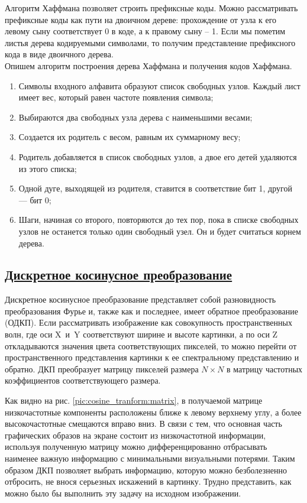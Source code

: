Алгоритм Хаффмана позволяет строить префиксные коды. Можно рассматривать префиксные коды как пути на двоичном дереве: прохождение от узла к его левому сыну соответствует 0 в коде, а к правому сыну – 1. Если мы пометим листья дерева кодируемыми символами, то получим представление префиксного кода в виде двоичного дерева.\\
Опишем алгоритм построения дерева Хаффмана и получения кодов Хаффмана.
\begin{enumerate}

	\item Символы входного алфавита образуют список свободных узлов. Каждый лист имеет вес, который равен частоте появления символа;
	\item Выбираются два свободных узла дерева с наименьшими весами;
	\item Создается их родитель с весом, равным их суммарному весу;
	\item Родитель добавляется в список свободных узлов, а двое его детей удаляются из этого списка;
	\item Одной дуге, выходящей из родителя, ставится в соответствие бит 1, другой — бит 0;
	\item Шаги, начиная со второго, повторяются до тех пор, пока в списке свободных узлов не останется только один свободный узел. Он и будет считаться корнем дерева.

\end{enumerate}


\subsection*{\hyperlink{toc}{Дискретное косинусное преобразование}}
Дискретное косинусное преобразование представляет собой разновидность преобразования Фурье и, также как и последнее, имеет обратное преобразование (ОДКП). Если рассматривать изображение как совокупность пространственных волн, где оси X~и~Y соответствуют ширине и высоте картинки, а по оси Z откладываются значения цвета соответствующих пикселей, то можно перейти от пространственного представления картинки к ее спектральному представлению и обратно. ДКП преобразует матрицу пикселей размера $N \times N$ в матрицу частотных коэффициентов соответствующего размера.

Как видно на рис. \ref{pic:cosine_tranform:matrix}, в получаемой матрице низкочастотные компоненты расположены ближе к левому верхнему углу, а более высокочастотные смещаются вправо вниз. В связи с тем, что основная часть графических образов на экране состоит из низкочастотной информации, используя полученную матрицу можно дифференцированно отбрасывать наименее важную информацию с минимальными визуальными потерями. Таким образом ДКП позволяет выбрать информацию, которую можно безболезненно отбросить, не внося серьезных искажений в картинку. Трудно представить, как можно было бы выполнить эту задачу на исходном изображении.


